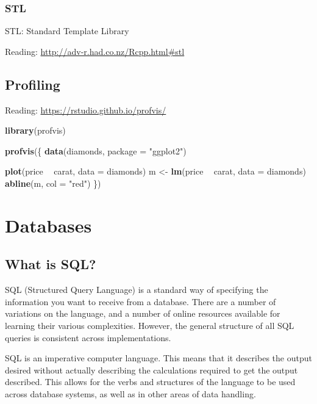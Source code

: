 \documentclass[]{book}
\newenvironment{Shaded}{\begin{snugshade}}{\end{snugshade}}
\newcommand{\KeywordTok}[1]{\textcolor[rgb]{0.13,0.29,0.53}{\textbf{#1}}}
\newcommand{\DataTypeTok}[1]{\textcolor[rgb]{0.13,0.29,0.53}{#1}}
\newcommand{\StringTok}[1]{\textcolor[rgb]{0.31,0.60,0.02}{#1}}
\newcommand{\OperatorTok}[1]{\textcolor[rgb]{0.81,0.36,0.00}{\textbf{#1}}}
\newcommand{\NormalTok}[1]{#1}
\theoremstyle{definition}
\theoremstyle{definition}
\theoremstyle{definition}
\theoremstyle{remark}
\begin{document}
\subsection{STL}\label{stl}

STL: Standard Template Library

Reading: \url{http://adv-r.had.co.nz/Rcpp.html\#stl}

\section{Profiling}\label{profiling}

Reading: \url{https://rstudio.github.io/profvis/}

\begin{Shaded}
\begin{Highlighting}[]
\KeywordTok{library}\NormalTok{(profvis)}

\KeywordTok{profvis}\NormalTok{(\{}
  \KeywordTok{data}\NormalTok{(diamonds, }\DataTypeTok{package =} \StringTok{"ggplot2"}\NormalTok{)}

  \KeywordTok{plot}\NormalTok{(price }\OperatorTok{~}\StringTok{ }\NormalTok{carat, }\DataTypeTok{data =}\NormalTok{ diamonds)}
\NormalTok{  m <-}\StringTok{ }\KeywordTok{lm}\NormalTok{(price }\OperatorTok{~}\StringTok{ }\NormalTok{carat, }\DataTypeTok{data =}\NormalTok{ diamonds)}
  \KeywordTok{abline}\NormalTok{(m, }\DataTypeTok{col =} \StringTok{"red"}\NormalTok{)}
\NormalTok{\})}
\end{Highlighting}
\end{Shaded}

\chapter{Databases}\label{databases}

\section{What is SQL?}\label{what-is-sql}

SQL (Structured Query Language) is a standard way of specifying the
information you want to receive from a database. There are a number of
variations on the language, and a number of online resources available
for learning their various complexities. However, the general structure
of all SQL queries is consistent across implementations.

SQL is an imperative computer language. This means that it describes the
output desired without actually describing the calculations required to
get the output described. This allows for the verbs and structures of
the language to be used across database systems, as well as in other
areas of data handling.
\end{document}
